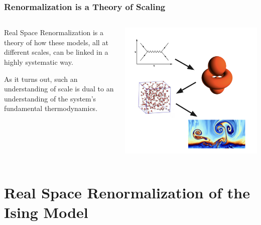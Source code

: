 \documentclass[aspectratio=169, 12pt]{beamer}
\begin{document}
\begin{frame}
    \frametitle{Renormalization is a Theory of Scaling}

    \begin{columns}
        
    \begin{column}{.6\textwidth}

        Real Space Renormalization is a theory of how these models, all at different scales, can be linked in a highly systematic way. 

        \vspace{1em}

        As it turns out, such an understanding of scale is dual to an understanding of the system's fundamental thermodynamics. 

    \end{column}
    \begin{column}{.4\textwidth}
        \includegraphics[width=\textwidth]{images/theory-flow.png}
    \end{column}
    \end{columns}
    
\end{frame}

\section{Real Space Renormalization of the Ising Model}
\end{document}
